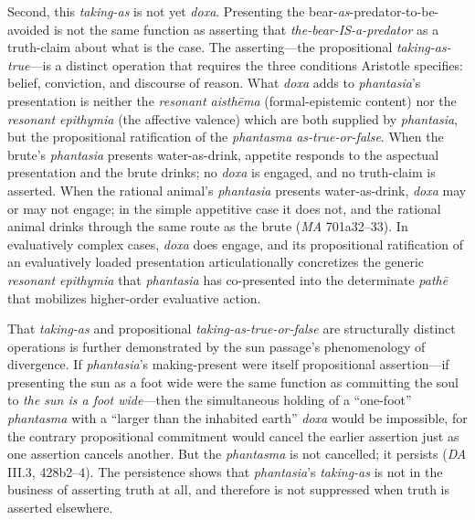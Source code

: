 \documentclass{article}
\begin{document}
Second, this \textit{taking-as} is not yet \textit{doxa}. Presenting the bear-\textit{as}-predator-to-be-avoided is not the same function as asserting that \textit{the-bear-IS-a-predator} as a truth-claim about what is the case. The asserting---the propositional \textit{taking-as-true}---is a distinct operation that requires the three conditions Aristotle specifies: belief, conviction, and discourse of reason. What \textit{doxa} adds to \textit{phantasia}'s presentation is neither the \textit{resonant aisthēma} (formal-epistemic content) nor the \textit{resonant epithymia} (the affective valence) which are both supplied by \textit{phantasia}, but the propositional ratification of the \textit{phantasma} \textit{as-true-or-false}. When the brute's \textit{phantasia} presents water-as-drink, appetite responds to the aspectual presentation and the brute drinks; no \textit{doxa} is engaged, and no truth-claim is asserted. When the rational animal's \textit{phantasia} presents water-as-drink, \textit{doxa} may or may not engage; in the simple appetitive case it does not, and the rational animal drinks through the same route as the brute (\textit{MA} 701a32--33). In evaluatively complex cases, \textit{doxa} does engage, and its propositional ratification of an evaluatively loaded presentation articulationally concretizes the generic \textit{resonant epithymia} that \textit{phantasia} has co-presented into the determinate \textit{pathē} that mobilizes higher-order evaluative action.

That \textit{taking-as} and propositional \textit{taking-as-true-or-false} are structurally distinct operations is further demonstrated by the sun passage's phenomenology of divergence. If \textit{phantasia}'s making-present were itself propositional assertion---if presenting the sun as a foot wide were the same function as committing the soul to \textit{the sun is a foot wide}---then the simultaneous holding of a ``one-foot'' \textit{phantasma} with a ``larger than the inhabited earth'' \textit{doxa} would be impossible, for the contrary propositional commitment would cancel the earlier assertion just as one assertion cancels another. But the \textit{phantasma} is not cancelled; it persists (\textit{DA} III.3, 428b2--4). The persistence shows that \textit{phantasia}'s \textit{taking-as} is not in the business of asserting truth at all, and therefore is not suppressed when truth is asserted elsewhere.
\end{document}
